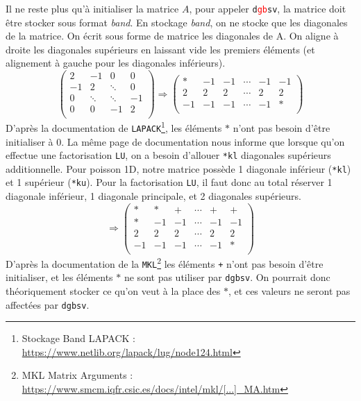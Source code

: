 \documentclass{article}
\begin{document}
Il ne reste plus qu'à initialiser la matrice $A$, pour appeler \texttt{d\textcolor{red}{gb}sv}, la matrice doit être stocker sous format \textit{band}.
En stockage \textit{band}, on ne stocke que les diagonales de la matrice. On écrit sous forme de matrice les diagonales de A. On aligne à droite les diagonales supérieurs en laissant vide les premiers éléments (et alignement à gauche pour les diagonales inférieurs).
\[
\begin{pmatrix}
		2	& 	-1	&	0	& 0	\\
		-1	&	2	&\ddots	& 0	\\
		0	& \ddots&\ddots	&-1	\\
		0	& 	0	& -1 	& 2	\\
	\end{pmatrix}
	\Longrightarrow
	\begin{pmatrix}
		\ast& 	-1	&	-1	&	\cdots	&	-1	&	-1	\\
		2	& 	2	&	2	&	\cdots	&	2	&	2	\\
		-1	& 	-1	&	-1	&	\cdots	&	-1	&	\ast\\
	\end{pmatrix}
\]
D'après la documentation de \texttt{LAPACK}\footnote{Stockage Band LAPACK : \href{https://www.netlib.org/lapack/lug/node124.html}{https://www.netlib.org/lapack/lug/node124.html}}, les éléments $\ast$ n'ont pas besoin d'être initialiser à 0.
La même page de documentation nous informe que lorsque qu'on effectue une factorisation \texttt{LU}, on a besoin d'allouer \texttt{*kl} diagonales supérieurs additionnelle. Pour poisson 1D, notre matrice possède 1 diagonale inférieur (\texttt{*kl}) et 1 supérieur (\texttt{*ku}). Pour la factorisation \texttt{LU}, il faut donc au total réserver 1 diagonale inférieur, 1 diagonale principale, et 2 diagonales supérieurs.
\[ 
	\Longrightarrow
	\begin{pmatrix}
		\ast& \ast	&	\texttt{+}	&	\cdots	&	\texttt{+}	&	\texttt{+}	\\
		\ast& 	-1	&	-1	&	\cdots	&	-1	&	-1	\\
		2	& 	2	&	2	&	\cdots	&	2	&	2	\\
		-1	& 	-1	&	-1	&	\cdots	&	-1	&	\ast\\
	\end{pmatrix}
\]
D'après la documentation de la \texttt{MKL}\footnote{MKL Matrix Arguments : \href{https://www.smcm.iqfr.csic.es/docs/intel/mkl/mkl_manual/appendices/mkl_appB_MA.htm}{https://www.smcm.iqfr.csic.es/docs/intel/mkl/[...]\_MA.htm}} les éléments \texttt{+} n'ont pas besoin d'être initialiser, et les éléments $\ast$ ne sont pas utiliser par \texttt{dgbsv}. On pourrait donc théoriquement stocker ce qu'on veut à la place des $\ast$, et ces valeurs ne seront pas affectées par \texttt{dgbsv}.
\end{document}
